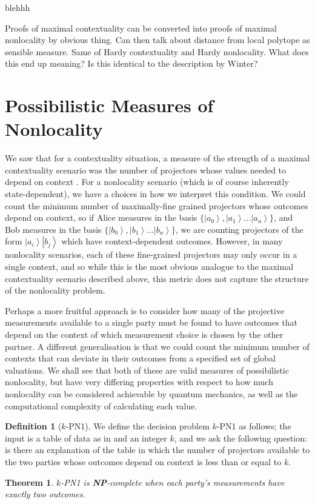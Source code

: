 \documentclass{amsart}
\newtheorem{thm}{Theorem}
\theoremstyle{definition}
\newtheorem{defn}{Definition}
\newcommand{\ket}[1]{{\left\vert{#1}\right\rangle}}
\begin{document}
blehhh

Proofs of maximal contextuality can be converted into proofs of maximal nonlocality by obvious thing. Can then talk about distance from local polytope as sensible measure. Same of Hardy contextuality and Hardy nonlocality.
What does this end up meaning? Is this identical to the description by Winter?

\section{Possibilistic Measures of Nonlocality}

We saw that for a contextuality situation, a measure of the strength of a maximal contextuality scenario was the number of projectors whose values needed to depend on context . For a nonlocality scenario (which is of course inherently state-dependent), we have a choices in how we interpret this condition. We could count the minimum number of maximally-fine grained projectors whose outcomes depend on context, so if Alice measures in the basis $\{\ket{a_0},\ket{a_1}\dots\ket{a_n}\}$, and Bob measures in the basis $\{\ket{b_0},\ket{b_1}\dots\ket{b_n}\}$, we are counting projectors of the form $\ket{a_i}\ket{b_j}$ which have context-dependent outcomes. However, in many nonlocality scenarios, each of these fine-grained projectors may only occur in a single context, and so while this is the most obvious analogue to the maximal contextuality scenario described above, this metric does not capture the structure of the nonlocality problem.

Perhaps a more fruitful approach is to consider how many of the projective measurements available to a single party must be found to have outcomes that depend on the context of which measurement choice is chosen by the other partner. A different generalisation is that we could count the minimum number of contexts that can deviate in their outcomes from a specified set of global valuations. We shall see that both of these are valid measures of possibilistic nonlocality, but have very differing properties with respect to how much nonlocality can be considered achievable by quantum mechanics, as well as the computational complexity of calculating each value.

\begin{defn}[$k$-\textsc{PN1}]
We define the decision problem $k$-\textsc{PN1} as follows; the input is a table of data as in \cite{Mans2011} and an integer $k$, and we ask the following question: is there an explanation of the table in which the number of projectors available to the two parties whose outcomes depend on context is less than or equal to $k$.
\end{defn}
\begin{thm}$k$-\textsc{PN1} is \textbf{NP}-complete when each party's measurements have exactly two outcomes.
\end{thm}
\end{document}
